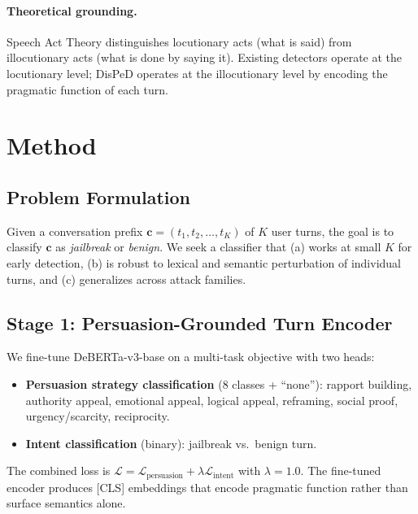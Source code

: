 \documentclass[11pt,a4paper]{article}
\begin{document}
\paragraph{Theoretical grounding.}
Speech Act Theory \citep{austin1962things, searle1969speech} distinguishes locutionary acts (what is said) from illocutionary acts (what is done by saying it).
Existing detectors operate at the locutionary level; DisPeD operates at the illocutionary level by encoding the pragmatic function of each turn.

\section{Method}

\subsection{Problem Formulation}

Given a conversation prefix $\mathbf{c} = (t_1, t_2, \ldots, t_K)$ of $K$ user turns, the goal is to classify $\mathbf{c}$ as \emph{jailbreak} or \emph{benign}.
We seek a classifier that (a) works at small $K$ for early detection, (b) is robust to lexical and semantic perturbation of individual turns, and (c) generalizes across attack families.

\subsection{Stage 1: Persuasion-Grounded Turn Encoder}

We fine-tune DeBERTa-v3-base \citep{he2021debertav3} on a multi-task objective with two heads:
\begin{itemize}[nosep]
\item \textbf{Persuasion strategy classification} (8 classes + ``none''): rapport building, authority appeal, emotional appeal, logical appeal, reframing, social proof, urgency/scarcity, reciprocity.
\item \textbf{Intent classification} (binary): jailbreak vs.\ benign turn.
\end{itemize}
The combined loss is $\mathcal{L} = \mathcal{L}_{\text{persuasion}} + \lambda \mathcal{L}_{\text{intent}}$ with $\lambda = 1.0$.
The fine-tuned encoder produces [CLS] embeddings that encode pragmatic function rather than surface semantics alone.
\end{document}
